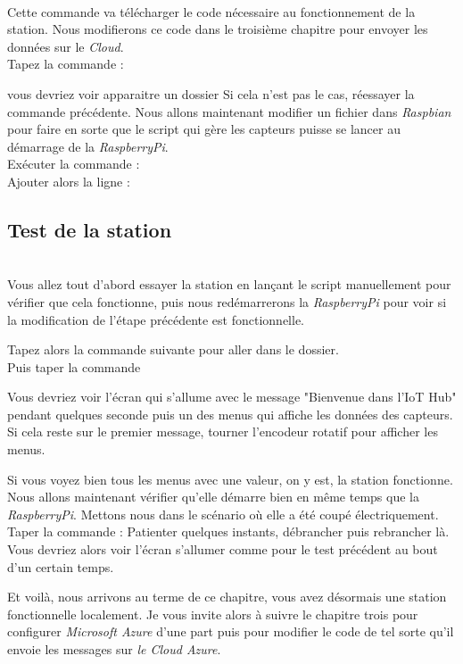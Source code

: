 \\
Cette commande va télécharger le code nécessaire au fonctionnement de la station. Nous modifierons ce code dans le troisième chapitre pour envoyer les données sur le \textit{Cloud}.\\
Tapez la commande :

vous devriez voir apparaitre un dossier %
Si cela n'est pas le cas, réessayer la commande précédente.
Nous allons maintenant modifier un fichier dans \textit{Raspbian} pour faire en sorte que le script qui gère les capteurs puisse se lancer au démarrage de la \textit{RaspberryPi}.\\

Exécuter la commande : 
\\
Ajouter alors la ligne : 
\\

\subsection{Test de la station}\\

Vous allez tout d'abord essayer la station en lançant le script manuellement pour vérifier que cela fonctionne, puis nous redémarrerons la \textit{RaspberryPi} pour voir si la modification de l'étape précédente est fonctionnelle.

Tapez alors la commande suivante pour aller dans le dossier. %
\\
Puis taper la commande %

Vous devriez voir l'écran qui s'allume avec le message "Bienvenue dans l'IoT Hub" pendant quelques seconde puis un des menus qui affiche les données des capteurs. Si cela reste sur le premier message, tourner l'encodeur rotatif pour afficher les menus.

Si vous voyez bien tous les menus avec une valeur, on y est, la station fonctionne. Nous allons maintenant vérifier qu'elle démarre bien en même temps que la \textit{RaspberryPi}.
Mettons nous dans le scénario où elle a été coupé électriquement. 
Taper la commande : %
Patienter quelques instants, débrancher puis rebrancher là. Vous devriez alors voir l'écran s'allumer comme pour le test précédent au bout d'un certain temps. %

Et voilà, nous arrivons au terme de ce chapitre, vous avez désormais une station fonctionnelle localement. Je vous invite alors à suivre le chapitre trois pour configurer \textit{Microsoft Azure} d'une part puis pour modifier le code de tel sorte qu'il envoie les messages sur \textit{le Cloud Azure}.



	
	
